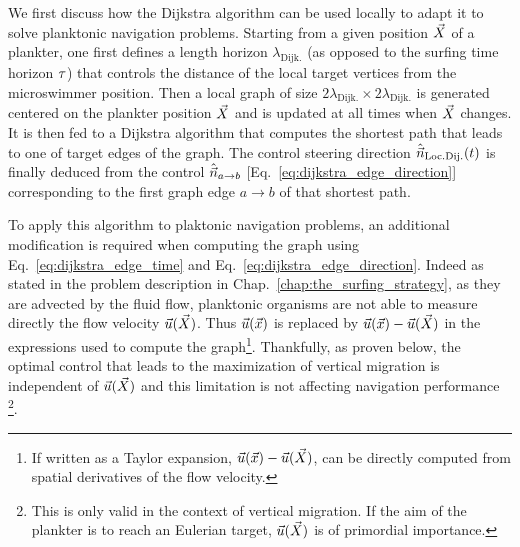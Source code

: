We first discuss how the Dijkstra algorithm can be used locally to adapt it to solve planktonic navigation problems.
Starting from a given position $\vec{X}$ of a plankter, one first defines a length horizon $\lambda_{\mathrm{Dijk.}}$ (as opposed to the surfing time horizon $\tau$) that controls the distance of the local target vertices from the microswimmer position.
Then a local graph of size $2\lambda_{\mathrm{Dijk.}} \times 2\lambda_{\mathrm{Dijk.}}$ is generated centered on the plankter position $\vec{X}$ and is updated at all times when $\vec{X}$ changes.
It is then fed to a Dijkstra algorithm that computes the shortest path that leads to one of target edges of the graph. 
The control steering direction $\hat{\vec{n}}_{\mathrm{Loc. Dij.}}(t)$ is finally deduced from the control $\hat{\vec{n}}_{a \to b}$ [Eq.~\eqref{eq:dijkstra_edge_direction}] corresponding to the first graph edge $a \to b$ of that shortest path.

To apply this algorithm to plaktonic navigation problems, an additional modification is required when computing the graph using Eq.~\eqref{eq:dijkstra_edge_time} and Eq.~\eqref{eq:dijkstra_edge_direction}.
Indeed as stated in the problem description in Chap.~\ref{chap:the_surfing_strategy}, as they are advected by the fluid flow, planktonic organisms are not able to measure directly the flow velocity $\vec{u}(\vec{X})$.
Thus $\vec{u}(\vec{x})$ is replaced by $\vec{u}(\vec{x}) - \vec{u}(\vec{X})$ in the expressions used to compute the graph\footnote{If written as a Taylor expansion, $\vec{u}(\vec{x}) - \vec{u}(\vec{X})$, can be directly computed from spatial derivatives of the flow velocity.}.
Thankfully, as proven below, the optimal control that leads to the maximization of vertical migration is independent of $\vec{u}(\vec{X})$ and this limitation is not affecting navigation performance \footnote{This is only valid in the context of vertical migration. If the aim of the plankter is to reach an Eulerian target, $\vec{u}(\vec{X})$ is of primordial importance.}.

